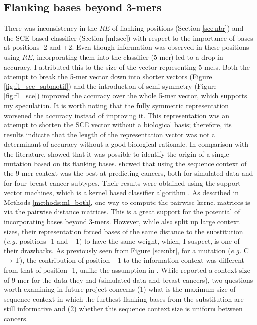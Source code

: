 \subsection{Flanking bases beyond 3-mers}
There was inconsistency in the $RE$ of flanking positions (Section \ref{sce:nbr}) and the SCE-based classifier (Section \ref{ml:sce}) with respect to the importance of bases at positions -2 and +2. Even though information was observed in these positions using $RE$, incorporating them into the classifier (5-mer) led to a drop in accuracy. I attributed this to the size of the vector representing 5-mers. Both the attempt to break the 5-mer vector down into shorter vectors (Figure \ref{fig:f1_sce_submotif}) and the introduction of semi-symmetry (Figure \ref{fig:f1_sce}) improved the accuracy over the whole 5-mer vector, which supports my speculation. It is worth noting that the fully symmetric representation worsened the accuracy instead of improving it. This representation was an attempt to shorten the SCE vector without a biological basis; therefore, its results indicate that the length of the representation vector was not a determinant of accuracy without a good biological rationale. In comparison with the literature, \citet{Zhu2020} showed that it was possible to identify the origin of a single mutation based on its flanking bases. \citep{Zhang2020} showed that using the sequence context of the 9-mer context was the best at predicting cancers, both for simulated data and for four breast cancer subtypes. Their results were obtained using the support vector machines, which is a kernel based classifier algorithm \citep{Susmita2019AAlgorithms}. As described in Methods \ref{methods:ml_both}, one way to compute the pairwise kernel matrices is via the pairwise distance matrices.  This is a great support for the potential of incorporating bases beyond 3-mers. However, while \citet{Zhang2020} also split up large context sizes, their representation forced bases of the same distance to the substitution (\textit{e.g.} positions -1 and +1) to have the same weight, which, I suspect, is one of their drawbacks. As previously seen from Figure \ref{sce:nbr}, for a mutation (\textit{e.g.} C$\rightarrow$T), the contribution of position +1 to the information context was different from that of position -1, unlike the assumption in \citet{Zhang2020}. While \citet{Zhang2020} reported a context size of 9-mer for the data they had (simulated data and breast cancers), two questions worth examining in future project concerns (1) what is the maximum size of sequence context in which the furthest flanking bases from the substitution are still informative and (2) whether this sequence context size is uniform between cancers. 

